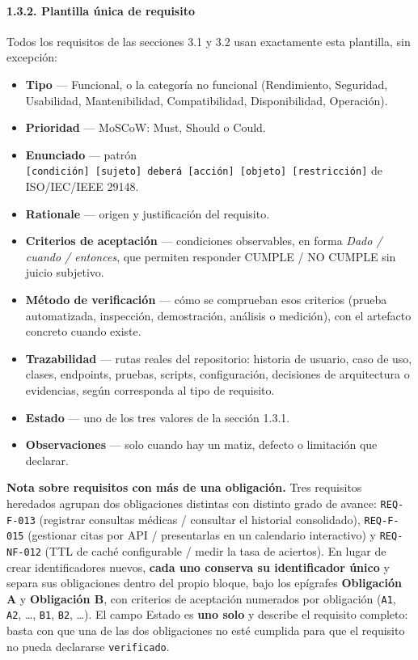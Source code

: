 \documentclass[
  spanish,
]{article}
\providecommand{\tightlist}{%
  \setlength{\itemsep}{0pt}\setlength{\parskip}{0pt}}
\begin{document}
\paragraph{1.3.2. Plantilla única de
requisito}\label{plantilla-uxfanica-de-requisito}

Todos los requisitos de las secciones 3.1 y 3.2 usan exactamente esta
plantilla, sin excepción:

\begin{itemize}
\tightlist
\item
  \textbf{Tipo} --- Funcional, o la categoría no funcional (Rendimiento,
  Seguridad, Usabilidad, Mantenibilidad, Compatibilidad, Disponibilidad,
  Operación).
\item
  \textbf{Prioridad} --- MoSCoW: Must, Should o Could.
\item
  \textbf{Enunciado} --- patrón
  \texttt{{[}condición{]}\ {[}\allowbreak{}sujeto{]}\ deberá\ {[}\allowbreak{}acción{]}\ {[}obje\allowbreak{}to{]}\ {[}restricc\allowbreak{}ión{]}}
  de ISO/IEC/IEEE 29148.
\item
  \textbf{Rationale} --- origen y justificación del requisito.
\item
  \textbf{Criterios de aceptación} --- condiciones observables, en forma
  \emph{Dado / cuando / entonces}, que permiten responder CUMPLE / NO
  CUMPLE sin juicio subjetivo.
\item
  \textbf{Método de verificación} --- cómo se comprueban esos criterios
  (prueba automatizada, inspección, demostración, análisis o medición),
  con el artefacto concreto cuando existe.
\item
  \textbf{Trazabilidad} --- rutas reales del repositorio: historia de
  usuario, caso de uso, clases, endpoints, pruebas, scripts,
  configuración, decisiones de arquitectura o evidencias, según
  corresponda al tipo de requisito.
\item
  \textbf{Estado} --- uno de los tres valores de la sección 1.3.1.
\item
  \textbf{Observaciones} --- solo cuando hay un matiz, defecto o
  limitación que declarar.
\end{itemize}

\textbf{Nota sobre requisitos con más de una obligación.} Tres
requisitos heredados agrupan dos obligaciones distintas con distinto
grado de avance: \texttt{REQ-\allowbreak{}F-\allowbreak{}013} (registrar consultas médicas /
consultar el historial consolidado), \texttt{REQ-\allowbreak{}F-\allowbreak{}015} (gestionar citas
por API / presentarlas en un calendario interactivo) y
\texttt{REQ-\allowbreak{}NF-\allowbreak{}012} (TTL de caché configurable / medir la tasa de
aciertos). En lugar de crear identificadores nuevos, \textbf{cada uno
conserva su identificador único} y separa sus obligaciones dentro del
propio bloque, bajo los epígrafes \textbf{Obligación A} y
\textbf{Obligación B}, con criterios de aceptación numerados por
obligación (\texttt{A1}, \texttt{A2}, \ldots, \texttt{B1}, \texttt{B2},
\ldots). El campo Estado es \textbf{uno solo} y describe el requisito
completo: basta con que una de las dos obligaciones no esté cumplida
para que el requisito no pueda declararse \texttt{verificado}.
\end{document}
